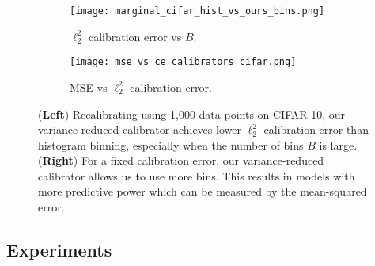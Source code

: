 \begin{figure}
  \centering
  \centering
     \begin{subfigure}[b]{0.55\textwidth}
         \centering
         \texttt{[image: marginal\_cifar\_hist\_vs\_ours\_bins.png]}
         \caption{$\ell_2^2$ calibration error vs $B$.}
         \label{fig:marginal_calibrator_comparison_cifar}
     \end{subfigure}
     \hfill
     \begin{subfigure}[b]{0.4\textwidth}
         \centering
         \texttt{[image: mse\_vs\_ce\_calibrators\_cifar.png]}
         \caption{MSE vs $\ell_2^2$ calibration error.}
         \label{fig:cifar_calibrator_cmp_mse_ce}
     \end{subfigure}
  \caption{
  (\textbf{Left}) Recalibrating using 1,000 data points on CIFAR-10, our variance-reduced calibrator achieves lower $\ell_2^2$ calibration error than histogram binning, especially when the number of bins $B$ is large.
  (\textbf{Right}) For a fixed calibration error, our variance-reduced calibrator allows us to use more bins. This results in models with more predictive power which can be measured by the mean-squared error.
  }
  \label{fig:nan2}
\end{figure}

\subsection{Experiments}
